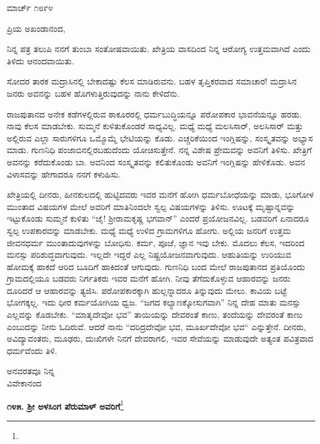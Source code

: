 \begin{flushright}
ಮಾರ್ಚ್ ೧೮೯೪
\end{flushright}

\noindent
ಪ್ರಿಯ ಅಖಂಡಾನಂದ,

ನಿನ್ನ ಪತ್ರ ತಲುಪಿ ನನಗೆ ತುಂಬಾ ಸಂತೋಷವಾಯಿತು. ಖೇತ್ರಿಯ ವಾಸದಿಂದ ನಿನ್ನ ಆರೋಗ್ಯ ಉತ್ತಮವಾಗಿದೆ ಎಂದು ತಿಳಿದು ಆನಂದವಾಯಿತು.

ಸೋದರ ತಾರಕ ಮದ್ರಾಸಿನಲ್ಲಿ ಬೇಕಾದಷ್ಟು ಕೆಲಸ ಮಾಡಿರುವನು. ಬಹಳ ತೃಪ್ತಿಕರವಾದ ಸಮಾಚಾರ! ಮದ್ರಾಸಿನ ಜನರು ಅವನನ್ನು ಬಹಳ ಹೊಗಳುತ್ತಿರುವುದನ್ನು ನಾನು ಕೇಳಿದೆನು.

ರಾಜಪುತಾನದ ಅನೇಕ ಕಡೆಗಳಲ್ಲಿರುವ ಠಾಕೂರರಲ್ಲಿ ಧರ್ಮಬುದ್ಧಿಯನ್ನೂ ಪರೋಪಕಾರ ಭಾವನೆಯನ್ನೂ ಹರಡು. ನಾವು ಕೆಲಸ ಮಾಡಬೇಕು. ಸುಮ್ಮನೆ ಕುಳಿತುಕೊಂಡರೆ ಸಾಧ್ಯವಿಲ್ಲ. ಮಧ್ಯೆ ಮಧ್ಯೆ ಮಲಸಿಸಾರ್, ಅಲಸಿಸಾರ್ ಮತ್ತು ಅಲ್ಲಿರುವ ಎಲ್ಲಾ ಸಾರುಗಳಿಗೂ ಒಮ್ಮೊಮ್ಮೆ ಭೇಟಿಯನ್ನು ಕೊಡು. ಎಚ್ಚರಿಕೆಯಿಂದ ಇಂಗ್ಲಿಷನ್ನು, ಸಂಸ್ಕೃತವನ್ನು ಅಭ್ಯಾಸ ಮಾಡು. ಗುಣನಿಧಿ ಪಂಜಾಬಿನಲ್ಲಿರಬಹುದೆಂದು ಯೋಚಿಸುತ್ತೇನೆ. ನನ್ನ ವಿಶೇಷ ಪ್ರೇಮವನ್ನು ಅವನಿಗೆ ತಿಳಿಸು. ಖೇತ್ರಿಗೆ ಅವನನ್ನು ಕರೆದುಕೊಂಡು ಬಾ. ಅವನಿಂದ ಸಂಸ್ಕೃತವನ್ನು ಕಲಿತುಕೊಂಡು ಅವನಿಗೆ ಇಂಗ್ಲಿಷನ್ನು ಹೇಳಿಕೊಡು. ಅವನ ವಿಳಾಸವನ್ನು ಹೇಗಾದರೂ ನನಗೆ ಕಳುಹಿಸು.

ಖೇತ್ರಿಯಲ್ಲಿ ದೀನರು, ಹೀನಕುಲದಲ್ಲಿ ಹುಟ್ಟಿದವರು ಇವರ ಮನೆಗೆ ಹೋಗಿ ಧರ್ಮಬೋಧೆಯನ್ನು ಮಾಡು, ಭೂಗೋಳ ಮುಂತಾದ ವಿಷಯಗಳ ಮೇಲೆ ಅವರಿಗೆ ಮಾತಿನಿಂದಲೇ ಸ್ವಲ್ಪ ವಿಷಯಗಳನ್ನು ತಿಳಿಸು. ಊಟಕ್ಕೆ ಮೃಷ್ಟಾನ್ನವನ್ನು ಇಟ್ಟುಕೊಂಡು ಸುಮ್ಮನೆ ಕುಳಿತು “ಜೈ! ಶ‍್ರೀರಾಮಕೃಷ್ಣ ಭಗವಾನ್” ಎಂದರೆ ಪ್ರಯೋಜನವಿಲ್ಲ. ಬಡವರಿಗೆ ಏನಾದರೂ ಸ್ವಲ್ಪ ಉಪಕಾರವನ್ನು ಮಾಡಬೇಕು. ಮಧ್ಯೆ ಮಧ್ಯೆ ಉಳಿದ ಗ್ರಾಮಗಳಿಗೂ ಹೋಗು. ಅಲ್ಲಿಯ ಜನರಿಗೆ ಉತ್ತಮ ಜೀವನಧರ್ಮ ಮುಂತಾದುವುಗಳನ್ನು ಬೋಧಿಸು. ಕರ್ಮ, ಪೂಜೆ, ಜ್ಞಾನ ಇವು ಬೇಕು. ಮೊದಲು ಕೆಲಸ, ಇದರಿಂದ ಮನಸ್ಸು ಪರಿಶುದ್ಧವಾಗುವುದು. ಇಲ್ಲದೇ ಇದ್ದರೆ ಎಲ್ಲ ನಿಷ್ಪ್ರಯೋಜನವಾಗುವುದು. ಆಹುತಿಯನ್ನು ಉರಿಯುವ ಹೋಮಕ್ಕೆ ಹಾಕದೆ ಆರಿದ ಬೂದಿಗೆ ಹಾಕಿದಂತೆ ಆಗುವುದು. ಗುಣನಿಧಿ ಬಂದ ಮೇಲೆ ರಾಜಪುತಾನದ ಪ್ರತಿಯೊಂದು ಗ್ರಾಮದಲ್ಲಿಯೂ ಬಡವರು ನಿರ್ಗತಿಕರು ಇವರ ಮನೆಗೆ ಹೋಗಿ. ನೀವು ತೆಗೆದುಕೊಳ್ಳುವ ಆಹಾರವನ್ನು ಜನರು ದೂರಿದರೆ ಆ ಆಹಾರವನ್ನು ತ್ಯಜಿಸಿ. ಪರೋಪಕಾರಕ್ಕಾಗಿ ಹುಲ್ಲನ್ನಾದರೂ ತಿನ್ನುವುದು ಮೇಲು. ಕಾವಿಯ ಬಟ್ಟೆ ಭೋಗಕ್ಕಲ್ಲ. ಇದು ಧೀರ ಕರ್ಮಯೋಗಿಯ ಧ್ವಜ. “ಜಗದ ಕಲ್ಯಾಣಕ್ಕೋಸುಗವಾಗಿ” ನಿನ್ನ ದೇಹ ಮಾತು ಮನಸ್ಸು ಎಲ್ಲವನ್ನು ಕೊಡಬೇಕು. “ಮಾತೃದೇವೋ ಭವ” ತಾಯಿಯನ್ನು ದೇವರಂತೆ ಕಾಣು, ತಂದೆಯನ್ನು ದೇವರಂತೆ ಕಾಣು ಎಂಬುದನ್ನು ನೀನು ಓದಿರುವೆ. ಆದರೆ ನಾನು “ದರಿದ್ರದೇವೋ ಭವ, ಮೂರ್ಖದೇವೋ ಭವ“ ಎನ್ನುತ್ತೇನೆ. ದೀನರು, ಅವಿದ್ಯಾವಂತರು, ಮೂಢರು, ದುಃಖಿಗಳೇ ನಿನಗೆ ದೇವರಾಗಲಿ, ಇವರ ಸೇವೆಯನ್ನು ಮಾಡುವುದೇ ಅತ್ಯಂತ ಪವಿತ್ರವಾದ ಧರ್ಮವೆಂದು ತಿಳಿ.

{\flushright
ಅನವರತವೂ ನಿನ್ನ\\ವಿವೇಕಾನಂದ\par}

\vspace{-0.5cm}

\begin{center}
\textbf{೧೪೫. ಶ‍್ರೀ ಅಳಸಿಂಗ ಪೆರುಮಾಳ್ ಅವರಿಗೆ}\footnote{}
\end{center}

